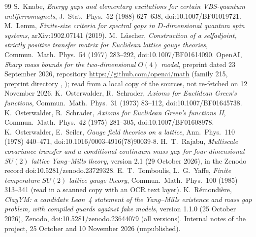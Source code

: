\documentclass[11pt,a4paper]{article}
\theoremstyle{plain}
\theoremstyle{definition}
\theoremstyle{remark}
\numberwithin{equation}{section}
\begin{document}
{\begin{thebibliography}{99}
 S.~Knabe, \emph{Energy gaps and elementary excitations for certain VBS-quantum antiferromagnets}, J.\ Stat.\ Phys.\ 52
(1988) 627--638, doi:10.1007/BF01019721.
 M.~Lemm, \emph{Finite-size criteria for spectral gaps in $D$-dimensional quantum spin systems}, arXiv:1902.07141 (2019).
 M.~L\"uscher, \emph{Construction of a selfadjoint, strictly positive transfer matrix for Euclidean lattice gauge
theories}, Commun.\ Math.\ Phys.\ 54 (1977) 283--292, doi:10.1007/BF01614090.
 OpenAI, \emph{Sharp mass bounds for the two-dimensional $O(4)$ model}, preprint dated 23 September 2026, repository
\url{https://github.com/openai/math} (family 215, preprint directory ,
); read from a local copy of the sources, not re-fetched on 12 November 2026.
 K.~Osterwalder, R.~Schrader, \emph{Axioms for Euclidean Green's functions}, Commun.\ Math.\ Phys.\ 31 (1973) 83--112,
doi:10.1007/BF01645738.
 K.~Osterwalder, R.~Schrader, \emph{Axioms for Euclidean Green's functions II}, Commun.\ Math.\ Phys.\ 42 (1975)
281--305, doi:10.1007/BF01608978.
 K.~Osterwalder, E.~Seiler, \emph{Gauge field theories on a lattice}, Ann.\ Phys.\ 110 (1978) 440--471,
doi:10.1016/0003-4916(78)90039-8.
 H.~T.~Rajabu, \emph{Multiscale covariance transfer and a conditional continuum mass gap for four-dimensional $SU(2)$
lattice Yang--Mills theory}, version 2.1 (29 October 2026), in the Zenodo record doi:10.5281/zenodo.23729328.
 E.~T.~Tomboulis, L.~G.~Yaffe, \emph{Finite temperature $SU(2)$ lattice gauge theory}, Commun.\ Math.\ Phys.\ 100 (1985) 313--341 (read in a scanned copy with an OCR text layer).
 K.~R\'emondi\`ere, \emph{ClayYM: a candidate Lean~4 statement of the Yang--Mills existence and mass gap problem, with
compiled guards against fake models}, version 1.1.0 (25 October 2026), Zenodo, doi:10.5281/zenodo.23644079 (all versions).
 Internal notes of the project, 25 October and 10 November 2026 (unpublished).
\end{thebibliography}}
\end{document}
